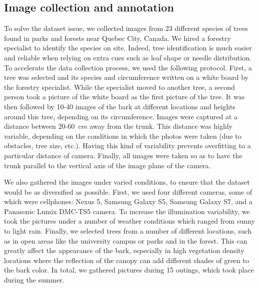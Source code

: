 \documentclass[letterpaper, 10 pt, conference]{ieeeconf}  %
\begin{document}
\subsection{Image collection and annotation}
\label{DatabaseDescription}
To solve the dataset issue, we collected images from 23 different species of trees found in parks and forests near Quebec City, Canada. We hired a forestry specialist to identify the species on site. Indeed, tree identification is much easier and reliable when relying on extra cues such as leaf shape or needle distribution. To accelerate the data collection process, we used the following protocol. First, a tree was selected and its species and circumference written on a white board by the forestry specialist. While the specialist moved to another tree, a second person took a picture of the white board as the first picture of the tree. It was then followed by 10-40 images of the bark at different locations and heights around this tree, depending on its circumference. Images were captured at a distance between 20-60~$cm$ away from the trunk. This distance was highly variable, depending on the conditions in which the photos were taken (due to obstacles, tree size, etc.). Having this kind of variability prevents overfitting to a particular distance of camera. Finally, all images were taken so as to have the trunk parallel to the vertical axis of the image plane of the camera.

We also gathered the images under varied conditions, to ensure that the dataset would be as diversified as possible. First, we used four different cameras, some of which were cellphones: Nexus 5, Samsung Galaxy S5, Samsung Galaxy S7, and a Panasonic Lumix DMC-TS5 camera. To increase the illumination variability, we took the pictures under a number of weather conditions which ranged from sunny to light rain. Finally, we selected trees from a number of different locations, such as in open areas like the university campus or parks and in the forest. This can greatly affect the appearance of the bark, especially in high vegetation density locations where the reflection of the canopy can add different shades of green to the bark color. In total, we gathered pictures during 15 outings, which took place during the summer.
\end{document}
